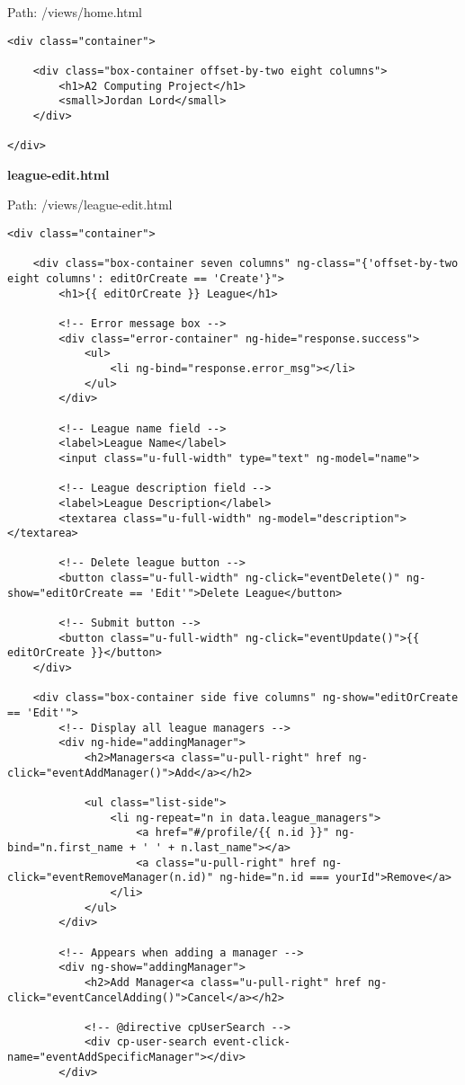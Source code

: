 Path: /views/home.html
{\scriptsize
\begin{lstlisting}
<div class="container">

	<div class="box-container offset-by-two eight columns">
		<h1>A2 Computing Project</h1>
		<small>Jordan Lord</small>
	</div>

</div>\end{lstlisting}
}
\textbf{league-edit.html}

Path: /views/league-edit.html
{\scriptsize
\begin{lstlisting}
<div class="container">

	<div class="box-container seven columns" ng-class="{'offset-by-two eight columns': editOrCreate == 'Create'}">
		<h1>{{ editOrCreate }} League</h1>

		<!-- Error message box -->
		<div class="error-container" ng-hide="response.success">
			<ul>
				<li ng-bind="response.error_msg"></li>
			</ul>
		</div>

		<!-- League name field -->
		<label>League Name</label>
		<input class="u-full-width" type="text" ng-model="name">

		<!-- League description field -->
		<label>League Description</label>
		<textarea class="u-full-width" ng-model="description"></textarea>

		<!-- Delete league button -->
		<button class="u-full-width" ng-click="eventDelete()" ng-show="editOrCreate == 'Edit'">Delete League</button>

		<!-- Submit button -->
		<button class="u-full-width" ng-click="eventUpdate()">{{ editOrCreate }}</button>
	</div>

	<div class="box-container side five columns" ng-show="editOrCreate == 'Edit'">
		<!-- Display all league managers -->
		<div ng-hide="addingManager">
			<h2>Managers<a class="u-pull-right" href ng-click="eventAddManager()">Add</a></h2>

			<ul class="list-side">
				<li ng-repeat="n in data.league_managers">
					<a href="#/profile/{{ n.id }}" ng-bind="n.first_name + ' ' + n.last_name"></a>
					<a class="u-pull-right" href ng-click="eventRemoveManager(n.id)" ng-hide="n.id === yourId">Remove</a>
				</li>
			</ul>
		</div>

		<!-- Appears when adding a manager -->
		<div ng-show="addingManager">
			<h2>Add Manager<a class="u-pull-right" href ng-click="eventCancelAdding()">Cancel</a></h2>

			<!-- @directive cpUserSearch -->
			<div cp-user-search event-click-name="eventAddSpecificManager"></div>
		</div>


\end{lstlisting}}
